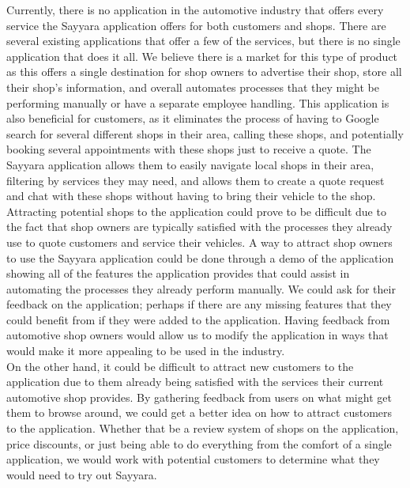 \documentclass{article}
\begin{document}
\noindent Currently, there is no application in the automotive industry that offers every service the Sayyara application offers for both customers and
shops. There are several existing applications that offer a few of the services, but there is no single application that does it all. We believe there is a
market for this type of product as this offers a single destination for shop owners to advertise their shop, store all their shop's information, and overall
automates processes that they might be performing manually or have a separate employee handling. This application is also beneficial for customers, as it
eliminates the process of having to Google search for several different shops in their area, calling these shops, and potentially booking several
appointments with these shops just to receive a quote. The Sayyara application allows them to easily navigate local shops in their area, filtering by
services they may need, and allows them to create a quote request and chat with these shops without having to bring their vehicle to the shop.\\

\noindent Attracting potential shops to the application could prove to be difficult due to the fact that shop owners are typically satisfied with the
processes they already use to quote customers and service their vehicles. A way to attract shop owners to use the Sayyara application could be done through
a demo of the application showing all of the features the application provides that could assist in automating the processes they already perform manually.
We could ask for their feedback on the application; perhaps if there are any missing features that they could benefit from if they were added to the
application. Having feedback from automotive shop owners would allow us to modify the application in ways that would make it more appealing to be used in
the industry.\\

\noindent On the other hand, it could be difficult to attract new customers to the application due to them already being satisfied with the services their
current automotive shop provides. By gathering feedback from users on what might get them to browse around, we could get a better idea on how to attract
customers to the application. Whether that be a review system of shops on the application, price discounts, or just being able to do everything from the
comfort of a single application, we would work with potential customers to determine what they would need to try out Sayyara.\\
\end{document}
